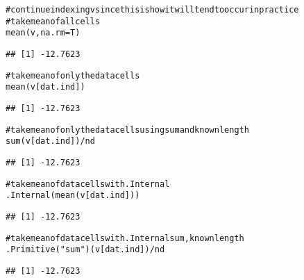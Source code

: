\documentclass{article}\usepackage[]{graphicx}\usepackage[]{color}
\makeatletter
\newcommand{\hlstr}[1]{\textcolor[rgb]{0.863,0.196,0.184}{#1}}%
\newcommand{\hlcom}[1]{\textcolor[rgb]{0.345,0.431,0.459}{#1}}%
\newcommand{\hlopt}[1]{\textcolor[rgb]{0.576,0.631,0.631}{#1}}%
\newcommand{\hlstd}[1]{\textcolor[rgb]{0.514,0.58,0.588}{#1}}%
\newcommand{\hlkwc}[1]{\textcolor[rgb]{0.796,0.294,0.086}{#1}}%
\newcommand{\hlkwd}[1]{\textcolor[rgb]{0.576,0.631,0.631}{#1}}%
\newenvironment{kframe}{%
 \def\at@end@of@kframe{}%
 \ifinner\ifhmode%
  \def\at@end@of@kframe{\end{minipage}}%
  \begin{minipage}{\columnwidth}%
 \fi\fi%
 \def\FrameCommand##1{\hskip\@totalleftmargin \hskip-\fboxsep
 \colorbox{shadecolor}{##1}\hskip-\fboxsep
     \hskip-\linewidth \hskip-\@totalleftmargin \hskip\columnwidth}%
 \MakeFramed {\advance\hsize-\width
   \@totalleftmargin\z@ \linewidth\hsize
   \@setminipage}}%
 {\par\unskip\endMakeFramed%
 \at@end@of@kframe}
\newenvironment{knitrout}{}{} %
\makeatother
\begin{document}
\begin{knitrout}
\color{fgcolor}\begin{kframe}
\begin{alltt}
\hlcom{# continue indexing v since this is how it will tend to occur in practice}
\hlcom{# take mean of all cells}
\hlkwd{mean}\hlstd{(v,} \hlkwc{na.rm} \hlstd{= T)}
\end{alltt}
\begin{verbatim}
## [1] -12.7623
\end{verbatim}
\begin{alltt}
\hlcom{# take mean of only the data cells}
\hlkwd{mean}\hlstd{(v[dat.ind])}
\end{alltt}
\begin{verbatim}
## [1] -12.7623
\end{verbatim}
\begin{alltt}
\hlcom{# take mean of only the data cells using sum and known length}
\hlkwd{sum}\hlstd{(v[dat.ind])}\hlopt{/}\hlstd{nd}
\end{alltt}
\begin{verbatim}
## [1] -12.7623
\end{verbatim}
\begin{alltt}
\hlcom{# take mean of data cells with .Internal}
\hlkwd{.Internal}\hlstd{(}\hlkwd{mean}\hlstd{(v[dat.ind]))}
\end{alltt}
\begin{verbatim}
## [1] -12.7623
\end{verbatim}
\begin{alltt}
\hlcom{# take mean of data cells with .Internal sum, known length}
\hlkwd{.Primitive}\hlstd{(}\hlstr{"sum"}\hlstd{)(v[dat.ind])}\hlopt{/}\hlstd{nd}
\end{alltt}
\begin{verbatim}
## [1] -12.7623
\end{verbatim}
\end{kframe}
\end{knitrout}
\end{document}
